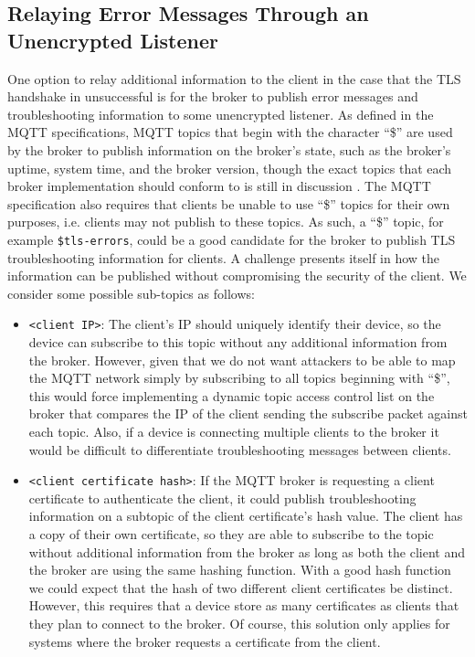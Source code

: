 \documentclass[12pt]{article}
\begin{document}
\subsection{Relaying Error Messages Through an Unencrypted Listener}
One option to relay additional information to the client in the case that the TLS handshake in unsuccessful is for the broker to publish error messages and troubleshooting information to some unencrypted listener. As defined in the MQTT specifications, MQTT topics that begin with the character ``\$'' are used by the broker to publish information on the broker's state, such as the broker's uptime, system time, and the broker version, though the exact topics that each broker implementation should conform to is still in discussion \cite{mqtt-sys}. The MQTT specification also requires that clients be unable to use ``\$'' topics for their own purposes, i.e. clients may not publish to these topics. As such, a ``\$'' topic, for example \texttt{\$tls-errors}, could be a good candidate for the broker to publish TLS troubleshooting information for clients. A challenge presents itself in how the information can be published without compromising the security of the client. We consider some possible sub-topics as follows:
\begin{itemize}
 \item \texttt{<client IP>}: The client's IP should uniquely identify their device, so the device can subscribe to this topic without any additional information from the broker. However, given that we do not want attackers to be able to map the MQTT network simply by subscribing to all topics beginning with ``\$'', this would force implementing a dynamic topic access control list on the broker that compares the IP of the client sending the subscribe packet against each topic. Also, if a device is connecting multiple clients to the broker it would be difficult to differentiate troubleshooting messages between clients.
\item \texttt{<client certificate hash>}: If the MQTT broker is requesting a client certificate to authenticate the client, it could publish troubleshooting information on a subtopic of the client certificate's hash value. The client has a copy of their own certificate, so they are able to subscribe to the topic without additional information from the broker as long as both the client and the broker are using the same hashing function. With a good hash function we could expect that the hash of two different client certificates be distinct. However, this requires that a device store as many certificates as clients that they plan to connect to the broker. Of course, this solution only applies for systems where the broker requests a certificate from the client.
 \end{itemize}
\end{document}

